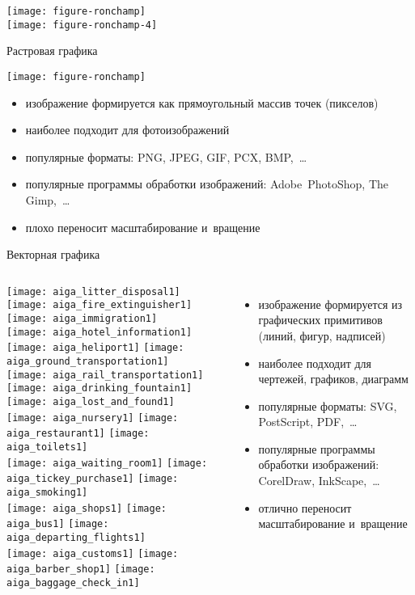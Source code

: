 {\texttt{[image: figure-ronchamp]}\\
\texttt{[image: figure-ronchamp-4]}}

\begin{frame}{Растровая графика}
\centerline{\texttt{[image: figure-ronchamp]}}
\begin{itemize}
\item изображение формируется как прямоугольный массив точек (пикселов)
\item наиболее подходит для фотоизображений
\item популярные форматы: PNG, JPEG, GIF, PCX, BMP,~…
\item популярные программы обработки изображений: Adobe~PhotoShop, The Gimp,~…
\item плохо переносит масштабирование и~вращение
\end{itemize}
\end{frame}

\begin{frame}{Векторная графика}
\label{vector}
\begin{columns}
\texttt{[image: aiga\_litter\_disposal1]}
\texttt{[image: aiga\_fire\_extinguisher1]}
\texttt{[image: aiga\_immigration1]}\\
\texttt{[image: aiga\_hotel\_information1]}
\texttt{[image: aiga\_heliport1]}
\texttt{[image: aiga\_ground\_transportation1]}\\
\texttt{[image: aiga\_rail\_transportation1]}
\texttt{[image: aiga\_drinking\_fountain1]}
\texttt{[image: aiga\_lost\_and\_found1]}\\
\texttt{[image: aiga\_nursery1]}
\texttt{[image: aiga\_restaurant1]}
\texttt{[image: aiga\_toilets1]}\\
\texttt{[image: aiga\_waiting\_room1]}
\texttt{[image: aiga\_tickey\_purchase1]}
\texttt{[image: aiga\_smoking1]}\\
\texttt{[image: aiga\_shops1]}
\texttt{[image: aiga\_bus1]}
\texttt{[image: aiga\_departing\_flights1]}\\
\texttt{[image: aiga\_customs1]}
\texttt{[image: aiga\_barber\_shop1]}
\texttt{[image: aiga\_baggage\_check\_in1]}
\begin{itemize}
\item изображение формируется из графических примитивов (линий, фигур, надписей)
\item наиболее подходит для чертежей, графиков, диаграмм
\item популярные форматы: SVG, PostScript, PDF,~…
\item популярные программы обработки изображений: CorelDraw, InkScape,~…
\item отлично переносит масштабирование и~вращение
\end{itemize}
\end{columns}
\end{frame}

